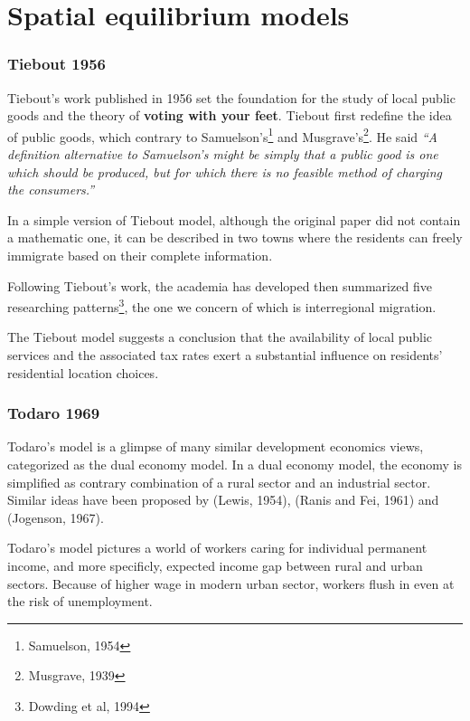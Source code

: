 \documentclass{article}
\numberwithin{equation}{section} %
\begin{document}
\part{Spatial equilibrium models}

\section{Tiebout 1956} %
\label{sec:tiebout_1956}
Tiebout's work published in 1956 set the foundation for the study of local public goods and the theory of \textbf{voting with your feet}. Tiebout first redefine the idea of public goods, which contrary to Samuelson's\footnote{Samuelson, 1954} and Musgrave's\footnote{Musgrave, 1939}. He said \textit{“A definition alternative to Samuelson's might be simply that a public good is one which should be produced, but for which there is no feasible method of charging the consumers.”}

In a simple version of Tiebout model, although the original paper did not contain a mathematic one, it can be described in two towns where the residents can freely immigrate based on their complete information.


Following Tiebout's work, the academia has developed then summarized five researching patterns\footnote{Dowding et al, 1994}, the one we concern of which is interregional migration.

The Tiebout model suggests a conclusion that the availability of local public services and the associated tax rates exert a substantial influence on residents' residential location choices.



\section{Todaro 1969} %
\label{sec:todaro_1969}

Todaro's model is a glimpse of many similar development economics views, categorized as the dual economy model. In a dual economy model, the economy is simplified as contrary combination of a rural sector and an industrial sector. Similar ideas have been proposed by (Lewis, 1954), (Ranis and Fei, 1961) and (Jogenson, 1967).

Todaro's model pictures a world of workers caring for individual permanent income, and more specificly, expected income gap between rural and urban sectors. Because of higher wage in modern urban sector, workers flush in even at the risk of unemployment.
\end{document}
